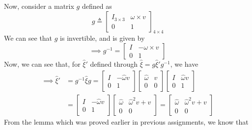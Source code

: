 Now, consider a matrix \( g \) defined as
\begin{equation*}
      g \triangleq
      \begin{bmatrix}
            I_{3\times 3} & \omega \times v \\
            0             & 1
      \end{bmatrix}_{4\times 4}
\end{equation*}
We can see that \( g \) is invertible, and is given by
\begin{equation*}
      \implies
      g^{-1} =
      \begin{bmatrix}
            I & - \omega \times v \\
            0 & 1
      \end{bmatrix}
\end{equation*}
Now, we can see that, for \( \hat{\xi}' \) defined through \( \hat \xi = g \hat{\xi}' g^{-1} \), we have
\begin{align*}
      \implies
      \hat{\xi}'
       & =
      g^{-1} \hat{\xi} g
      =
      \begin{bmatrix}
            I & - \hat \omega v \\
            0 & 1
      \end{bmatrix}
      \begin{bmatrix}
            \hat \omega & v \\
            0           & 0
      \end{bmatrix}
      \begin{bmatrix}
            I & \hat \omega v \\
            0 & 1
      \end{bmatrix}
      \\ & =
      \begin{bmatrix}
            I & - \hat \omega v \\
            0 & 1
      \end{bmatrix}
      \begin{bmatrix}
            \hat \omega & {\hat{\omega}}^2 v + v \\
            0           & 0
      \end{bmatrix}
      =
      \begin{bmatrix}
            \hat \omega & {\hat{\omega}}^2 v + v \\
            0           & 0
      \end{bmatrix}
\end{align*}
From the lemma which was proved earlier in previous assignments, we know that
